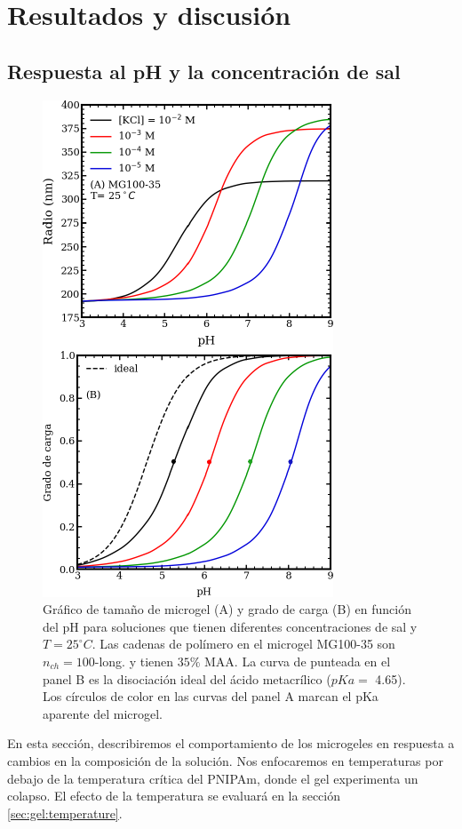 \section{Resultados y discusi\'on}



\subsection{Respuesta al pH y la concentraci\'on de sal}\label{sec:gel:pH_salt}


\begin{figure}[!ht]
\centering
\includegraphics[width=0.40\linewidth]{Figures/graph-gel/R-pH.pdf}
\caption{Gr\'afico de tama\~no de microgel (A) y grado de carga (B) en funci\'on del pH para soluciones que tienen diferentes concentraciones de sal y $T=25 ^\circ C$.
	Las cadenas de pol\'imero en el microgel MG100-35 son $n_{ch}=100$-long. y tienen $35\% $ MAA.
	La curva de  punteada en el panel B es la disociaci\'on ideal del \'acido metacr\'ilico ($pKa=$ 4.65).
	Los c\'irculos de color en las curvas del panel A marcan el pKa aparente del microgel.}
\label{fig:gel:R-pH}
\end{figure}

En esta secci\'on, describiremos el comportamiento de los microgeles en respuesta a cambios en la composici\'on de la soluci\'on. Nos enfocaremos en temperaturas por debajo de la temperatura cr\'itica del PNIPAm, donde el gel experimenta un colapso. El efecto de la temperatura se evaluar\'a en la secci\'on \ref{sec:gel:temperature}.

